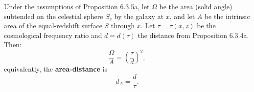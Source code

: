 Under the assumptions of Proposition 6.3.5a, let $\Omega$ be the area (solid angle) subtended on the celestial sphere $S_z$ by the galaxy at $x$, and let $A$ be the intrinsic area of the equal-redshift surface $S$ through $x$. Let $\tau = \tau(x, z)$ be the cosmological frequency ratio and $d = d(\tau)$ the distance from Proposition 6.3.4a. Then:
$$\frac{\Omega}{A} = \left(\frac{\tau}{d}\right)^2,$$
equivalently, the \textbf{area-distance} is
$$d_A = \frac{d}{\tau}.$$
